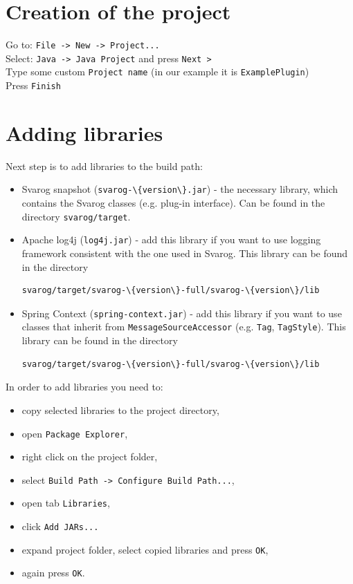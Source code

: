 \documentclass{article}
\begin{document}
\section{Creation of the project}
\label{project}
Go to: \verb=File -> New -> Project...=\\
Select: \verb=Java -> Java Project= and press \verb=Next >= \\
Type some custom \verb=Project name= (in our example it is \verb=ExamplePlugin=) \\
Press \verb=Finish=

\section{Adding libraries}
\label{libraries}
Next step is to add libraries to the build path:
\begin{itemize}
	\item Svarog snapshot (\verb=svarog-\{version\}.jar=) -
		the necessary library, which contains the Svarog classes (e.g. plug-in interface).
		Can be found in the directory \verb=svarog/target=.
	\item Apache log4j (\verb=log4j.jar=) - add this library if you want to use logging framework
		consistent with the one used in Svarog.
		This library can be found in the directory
		\small
		\begin{verbatim}svarog/target/svarog-\{version\}-full/svarog-\{version\}/lib\end{verbatim}
		\normalsize
	\item Spring Context (\verb=spring-context.jar=) - add this library if you want to use classes
		that inherit from \verb=MessageSourceAccessor= (e.g. \verb=Tag=, \verb=TagStyle=).
		This library can be found in the directory
		\small
		\begin{verbatim}svarog/target/svarog-\{version\}-full/svarog-\{version\}/lib\end{verbatim}
		\normalsize
\end{itemize}

In order to add libraries you need to:
\begin{itemize}
	\item copy selected libraries to the project directory,
	\item open \verb=Package Explorer=,
	\item right click on the project folder,
	\item select \verb=Build Path -> Configure Build Path...=,
	\item open tab \verb=Libraries=,
	\item click \verb=Add JARs...=
	\item expand project folder, select copied libraries and press \verb=OK=,
	\item again press \verb=OK=. 
\end{itemize}
\end{document}
